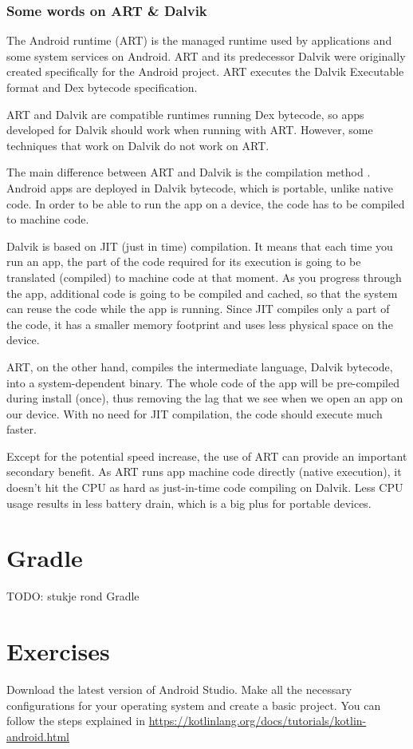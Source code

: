 \subsubsection{Some words on ART \& Dalvik}
The Android runtime (ART) \cite{Android2019} is the managed runtime used by applications and some system services on Android.
ART and its predecessor Dalvik were originally created specifically for the Android project.
ART executes the Dalvik Executable format and Dex bytecode specification.

ART and Dalvik are compatible runtimes running Dex bytecode, so apps developed for Dalvik should work when running with ART.
However, some techniques that work on Dalvik do not work on ART.

The main difference between ART and Dalvik is the compilation method \cite{Vitas2013}.
Android apps are deployed in Dalvik bytecode, which is portable, unlike native code.
In order to be able to run the app on a device, the code has to be compiled to machine code.

Dalvik is based on JIT (just in time) compilation.
It means that each time you run an app, the part of the code required for its execution is going to be translated (compiled) to machine code at that moment.
As you progress through the app, additional code is going to be compiled and cached, so that the system can reuse the code while the app is running.
Since JIT compiles only a part of the code, it has a smaller memory footprint and uses less physical space on the device.

ART, on the other hand, compiles the intermediate language, Dalvik bytecode, into a system-dependent binary.
The whole code of the app will be pre-compiled during install (once), thus removing the lag that we see when we open an app on our device.
With no need for JIT compilation, the code should execute much faster.

Except for the potential speed increase, the use of ART can provide an important secondary benefit.
As ART runs app machine code directly (native execution), it doesn't hit the CPU as hard as just-in-time code compiling on Dalvik.
Less CPU usage results in less battery drain, which is a big plus for portable devices.

\section{Gradle}
TODO: stukje rond Gradle


\section{Exercises}
\begin{exercise}
	Download the latest version of Android Studio.
	Make all the necessary configurations for your operating system and create a basic project.
	You can follow the steps explained in \url{https://kotlinlang.org/docs/tutorials/kotlin-android.html}
\end{exercise}

